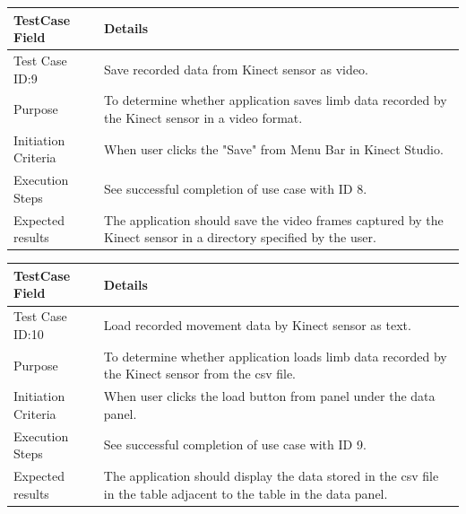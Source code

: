 \documentclass[a4paper, 12pt]{article}
\begin{document}
\begin{table}[!htb]
 \begin{tabular}{|p{4cm}|p{10cm}|}
 \hline
  TestCase Field & Details \\
  \hline
   Test Case ID:9 & Save recorded data from Kinect sensor as video. \\
  \hline 
   Purpose & To determine whether application saves limb data recorded by the Kinect sensor in a video format. \\
  \hline
   Initiation Criteria & When user clicks the "Save" from Menu Bar in Kinect Studio.  \\
  \hline
   Execution Steps & See successful completion of use case with ID 8.  \\
  \hline
   Expected results & The application should save the video frames captured by the Kinect sensor in a directory specified by the user. \\
  \hline
 \end{tabular}
\end{table}

\begin{table}[!htb]
 \begin{tabular}{|p{4cm}|p{10cm}|}
 \hline
  TestCase Field & Details \\
  \hline
   Test Case ID:10 & Load recorded movement data by Kinect sensor as text. \\
  \hline 
   Purpose & To determine whether application loads limb data recorded by the Kinect sensor from the csv file. \\
  \hline
   Initiation Criteria & When user clicks the load button from panel under the data panel.  \\
  \hline
   Execution Steps & See successful completion of use case with ID 9.  \\
  \hline
   Expected results & The application should display the data stored in the csv file in the table adjacent to the table in the data panel. \\
  \hline
 \end{tabular}
\end{table}
\end{document}
